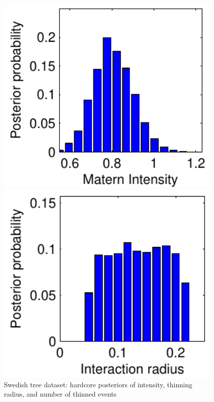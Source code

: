 \documentclass{statsoc}
\begin{document}
  \begin{figure}
  \begin{minipage}[h]{0.233\linewidth}
  \caption[Posterior distributions of the homogeneous \matern type-III hardcore model for the Swedish pine tree dataset]
  {Swedish tree dataset:  \matern hardcore posteriors of intensity, thinning radius, and number of thinned events}
  \label{fig:swedish_hc_post}
  \end{minipage}
  \begin{minipage}[h]{0.25\linewidth}
  \centering
    \includegraphics[width=0.99\textwidth]{figs/plot_swedish_l_hc.pdf} 
  \end{minipage}
  \begin{minipage}[h]{0.25\linewidth}
  \centering
    \includegraphics[width=0.99\textwidth]{figs/plot_swedish_r_hc.pdf} 

\end{minipage}
\end{figure}
\end{document}
